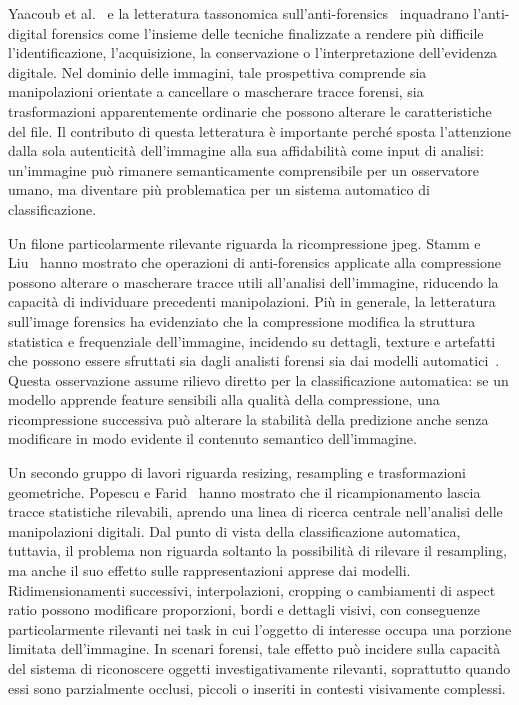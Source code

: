 Yaacoub et al.~\cite{yaacoub2021digital} e la letteratura tassonomica sull'anti-forensics~\cite{hewling2018anti} inquadrano l'anti-digital forensics come l'insieme delle tecniche finalizzate a rendere più difficile l'identificazione, l'acquisizione, la conservazione o l'interpretazione dell'evidenza digitale. Nel dominio delle immagini, tale prospettiva comprende sia manipolazioni orientate a cancellare o mascherare tracce forensi, sia trasformazioni apparentemente ordinarie che possono alterare le caratteristiche del file. Il contributo di questa letteratura è importante perché sposta l'attenzione dalla sola autenticità dell'immagine alla sua affidabilità come input di analisi: un'immagine può rimanere semanticamente comprensibile per un osservatore umano, ma diventare più problematica per un sistema automatico di classificazione.

Un filone particolarmente rilevante riguarda la ricompressione \gls{jpeg}. Stamm e Liu~\cite{stamm2010anti} hanno mostrato che operazioni di anti-forensics applicate alla compressione possono alterare o mascherare tracce utili all'analisi dell'immagine, riducendo la capacità di individuare precedenti manipolazioni. Più in generale, la letteratura sull'image forensics ha evidenziato che la compressione modifica la struttura statistica e frequenziale dell'immagine, incidendo su dettagli, texture e artefatti che possono essere sfruttati sia dagli analisti forensi sia dai modelli automatici~\cite{farid2016photo,stamm2013information}. Questa osservazione assume rilievo diretto per la classificazione automatica: se un modello apprende feature sensibili alla qualità della compressione, una ricompressione successiva può alterare la stabilità della predizione anche senza modificare in modo evidente il contenuto semantico dell'immagine.

Un secondo gruppo di lavori riguarda resizing, resampling e trasformazioni geometriche. Popescu e Farid~\cite{popescu2005exposing} hanno mostrato che il ricampionamento lascia tracce statistiche rilevabili, aprendo una linea di ricerca centrale nell'analisi delle manipolazioni digitali. Dal punto di vista della classificazione automatica, tuttavia, il problema non riguarda soltanto la possibilità di rilevare il resampling, ma anche il suo effetto sulle rappresentazioni apprese dai modelli. Ridimensionamenti successivi, interpolazioni, cropping o cambiamenti di aspect ratio possono modificare proporzioni, bordi e dettagli visivi, con conseguenze particolarmente rilevanti nei task in cui l'oggetto di interesse occupa una porzione limitata dell'immagine. In scenari forensi, tale effetto può incidere sulla capacità del sistema di riconoscere oggetti investigativamente rilevanti, soprattutto quando essi sono parzialmente occlusi, piccoli o inseriti in contesti visivamente complessi.

